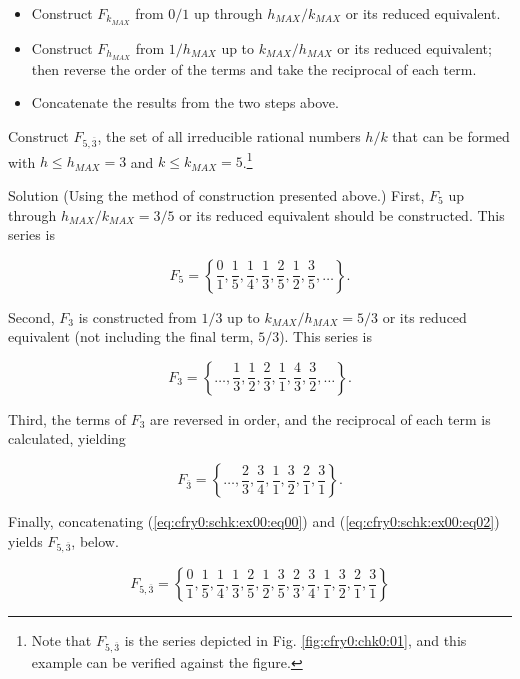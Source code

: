 \begin{itemize}
\item Construct $F_{k_{MAX}}$ from $0/1$ up through $h_{MAX}/k_{MAX}$ or its
      reduced equivalent.
\item Construct $F_{h_{MAX}}$ from $1/h_{MAX}$ up to $k_{MAX}/h_{MAX}$ or
      its reduced equivalent; then reverse the order of the 
	  terms and take the reciprocal of
      each term.
\item Concatenate the results from the two steps above.
\end{itemize}

\begin{vworkexamplestatement}
\label{ex:cfry0:schk:00}
Construct $F_{5,\overline{3}}$, the set of 
all irreducible rational numbers $h/k$
that can be formed with $h \leq h_{MAX}=3$ and 
$k \leq k_{MAX}=5$.\footnote{Note that $F_{5,\overline{3}}$
is the series depicted in Fig. \ref{fig:cfry0:chk0:01}, and
this example can be verified against the figure.}
\end{vworkexamplestatement}
\begin{vworkexampleparsection}{Solution}
(Using the method of construction presented above.)
First, $F_5$ up through $h_{MAX}/k_{MAX} = 3/5$ or its reduced
equivalent should be constructed.  This series is

\begin{equation}
\label{eq:cfry0:schk:ex00:eq00}
F_5 = 
\left\{ { \frac{0}{1}, \frac{1}{5}, \frac{1}{4},
          \frac{1}{3}, \frac{2}{5}, \frac{1}{2},
          \frac{3}{5}, \ldots{} } \right\} .
\end{equation}

Second, $F_3$ is constructed from $1/3$ up to $k_{MAX}/h_{MAX} = 5/3$ or
its reduced equivalent (not including the
final term, $5/3$).  This series is

\begin{equation}
\label{eq:cfry0:schk:ex00:eq01}
F_3 = 
\left\{ { \ldots , \frac{1}{3}, \frac{1}{2}, \frac{2}{3},
          \frac{1}{1}, \frac{4}{3}, \frac{3}{2}, \ldots{} } \right\} .
\end{equation}

Third, the terms of $F_3$ are reversed in order, and the reciprocal of each term is
calculated, yielding

\begin{equation}
\label{eq:cfry0:schk:ex00:eq02}
F_{\overline{3}} = 
\left\{ { \ldots{}, \frac{2}{3}, \frac{3}{4}, \frac{1}{1},
          \frac{3}{2}, \frac{2}{1}, \frac{3}{1}  } \right\} .
\end{equation}

Finally, concatenating (\ref{eq:cfry0:schk:ex00:eq00})
and
(\ref{eq:cfry0:schk:ex00:eq02}) yields $F_{5,\overline{3}}$, below.

\begin{equation}
\label{eq:cfry0:schk:ex00:eq03}
F_{5,\overline{3}} =
\left\{ { \frac{0}{1}, \frac{1}{5}, \frac{1}{4},
          \frac{1}{3}, \frac{2}{5}, \frac{1}{2},
          \frac{3}{5},
          \frac{2}{3}, \frac{3}{4}, \frac{1}{1},
          \frac{3}{2}, \frac{2}{1}, \frac{3}{1} } \right\}
\end{equation}

\end{vworkexampleparsection}

